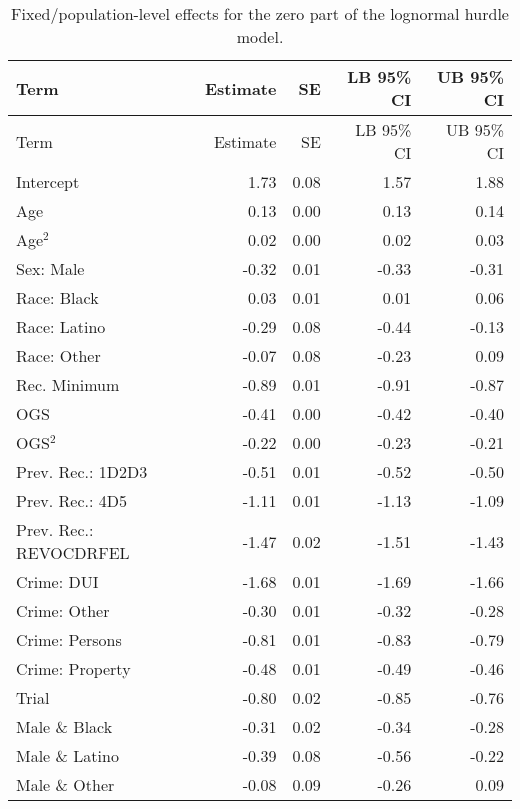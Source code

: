 \documentclass[
  letterpaper,
  DIV=11,
  numbers=noendperiod]{scrartcl}
\begin{document}
\hypertarget{tbl-brms-hurdle-model-summary-2-zero}{}
\begin{longtable}[]{@{}lrrrr@{}}
\caption{\label{tbl-brms-hurdle-model-summary-2-zero}Fixed/population-level
effects for the zero part of the lognormal hurdle model.}\tabularnewline
\toprule\noalign{}
Term & Estimate & SE & LB 95\% CI & UB 95\% CI \\
\midrule\noalign{}
\endfirsthead
\toprule\noalign{}
Term & Estimate & SE & LB 95\% CI & UB 95\% CI \\
\midrule\noalign{}
\endhead
\bottomrule\noalign{}
\endlastfoot
Intercept & 1.73 & 0.08 & 1.57 & 1.88 \\
Age & 0.13 & 0.00 & 0.13 & 0.14 \\
Age\(^2\) & 0.02 & 0.00 & 0.02 & 0.03 \\
Sex: Male & -0.32 & 0.01 & -0.33 & -0.31 \\
Race: Black & 0.03 & 0.01 & 0.01 & 0.06 \\
Race: Latino & -0.29 & 0.08 & -0.44 & -0.13 \\
Race: Other & -0.07 & 0.08 & -0.23 & 0.09 \\
Rec. Minimum & -0.89 & 0.01 & -0.91 & -0.87 \\
OGS & -0.41 & 0.00 & -0.42 & -0.40 \\
OGS\(^2\) & -0.22 & 0.00 & -0.23 & -0.21 \\
Prev. Rec.: 1D2D3 & -0.51 & 0.01 & -0.52 & -0.50 \\
Prev. Rec.: 4D5 & -1.11 & 0.01 & -1.13 & -1.09 \\
Prev. Rec.: REVOCDRFEL & -1.47 & 0.02 & -1.51 & -1.43 \\
Crime: DUI & -1.68 & 0.01 & -1.69 & -1.66 \\
Crime: Other & -0.30 & 0.01 & -0.32 & -0.28 \\
Crime: Persons & -0.81 & 0.01 & -0.83 & -0.79 \\
Crime: Property & -0.48 & 0.01 & -0.49 & -0.46 \\
Trial & -0.80 & 0.02 & -0.85 & -0.76 \\
Male \& Black & -0.31 & 0.02 & -0.34 & -0.28 \\
Male \& Latino & -0.39 & 0.08 & -0.56 & -0.22 \\
Male \& Other & -0.08 & 0.09 & -0.26 & 0.09 \\
\end{longtable}
\end{document}
